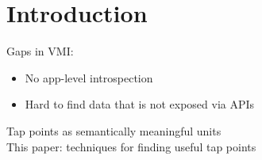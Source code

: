 \section{Introduction}

Gaps in VMI:

\begin{itemize}
\item No app-level introspection
\item Hard to find data that is not exposed via APIs
\end{itemize}

\noindent
Tap points as semantically meaningful units \\

\noindent
This paper: techniques for finding useful tap points

